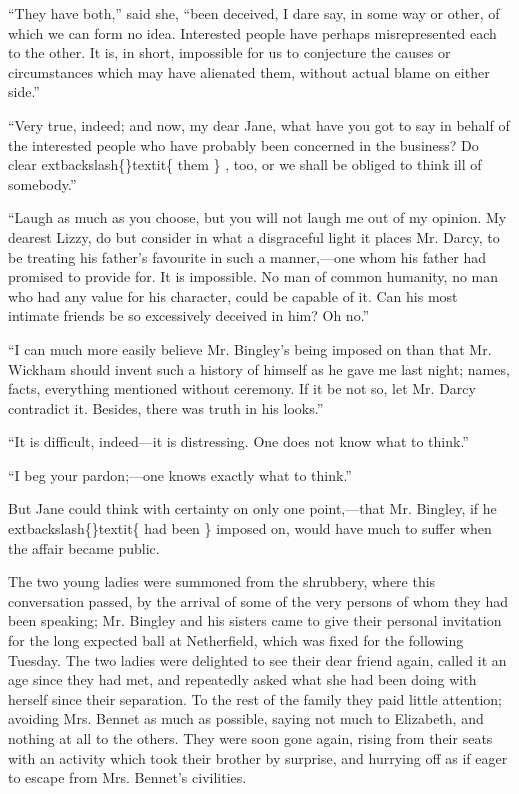 \documentclass[10pt]{book}
\begin{document}
   “They have both,” said she, “been deceived, I dare say, in some way or
other, of which we can form no idea. Interested people have perhaps
misrepresented each to the other. It is, in short, impossible for us to
conjecture the causes or circumstances which may have alienated them,
without actual blame on either side.”
  

   “Very true, indeed; and now, my dear Jane, what have you got to say in
behalf of the interested people who have probably been concerned in the
business? Do clear
   	extbackslash\{\}textit\{
    them
   \}
   , too, or we shall be obliged to think ill of
somebody.”
  

   “Laugh as much as you choose, but you will not laugh me out of my
opinion. My dearest Lizzy, do but consider in what a disgraceful light
it places Mr. Darcy, to be treating his father’s favourite in such a
manner,—one whom his father had promised to provide for. It is
impossible. No man of common humanity, no man who had any value for his
character, could be capable of it. Can his most intimate friends be so
excessively deceived in him? Oh no.”
  

   “I can much more easily believe Mr. Bingley’s being imposed on than that
Mr. Wickham should invent such a history of himself as he gave me last
night; names, facts, everything mentioned without ceremony. If it be not
so, let Mr. Darcy contradict it. Besides, there was truth in his looks.”
  

   “It is difficult, indeed—it is distressing. One does not know what to
think.”
  

   “I beg your pardon;—one knows exactly what to think.”
  

   But Jane could think with certainty on only one point,—that Mr.
Bingley, if he
   	extbackslash\{\}textit\{
    had been
   \}
   imposed on,
   would have much to suffer when
the affair became public.
  

   The two young ladies were summoned from the shrubbery, where this
conversation passed, by the arrival of some of the very persons of whom
they had been speaking; Mr. Bingley and his sisters came to give their
personal invitation for the long expected ball at Netherfield, which was
fixed for the following Tuesday. The two ladies were delighted to see
their dear friend again, called it an age since they had met, and
repeatedly asked what she had been doing with herself since their
separation. To the rest of the family they paid little attention;
avoiding Mrs. Bennet as much as possible, saying not much to Elizabeth,
and nothing at all to the others. They were soon gone again, rising from
their seats with an activity which took their brother by surprise, and
hurrying off as if eager to escape from Mrs. Bennet’s civilities.
  
\end{document}
